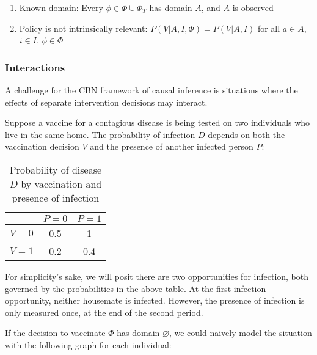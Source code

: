 \begin{enumerate}
    \item Known domain: Every $\phi\in\Phi\cup \Phi_T$ has domain $A$, and $A$ is observed
    \item Policy is not intrinsically relevant: $P(V|A,I,\Phi)=P(V|A,I)$ for all $a\in A$, $i\in I$, $\phi\in \Phi$
\end{enumerate}

\subsubsection{Interactions}\label{sssec:SUTVA}

A challenge for the CBN framework of causal inference is situations where the effects of separate intervention decisions may interact.

Suppose a vaccine for a contagious disease is being tested on two individuals who live in the same home. The probability of infection $D$ depends on both the vaccination decision $V$ and the presence of another infected person $P$:

\begin{table}[]
    \centering
    \begin{tabular}{c|c|c}
        & $P=0$ & $P=1$ \\
         \hline
        $V=0$ & 0.5 & 1 \\
        $V=1$ & 0.2 & 0.4
    \end{tabular}
    \caption{Probability of disease $D$ by vaccination and presence of infection}
    \label{tab:vaccination_interaction}
\end{table}

For simplicity's sake, we will posit there are two opportunities for infection, both governed by the probabilities in the above table. At the first infection opportunity, neither housemate is infected. However, the presence of infection is only measured once, at the end of the second period.

If the decision to vaccinate $\Phi$ has domain $\varnothing$, we could naively model the situation with the following graph for each individual:

\begin{center}
\end{center}

